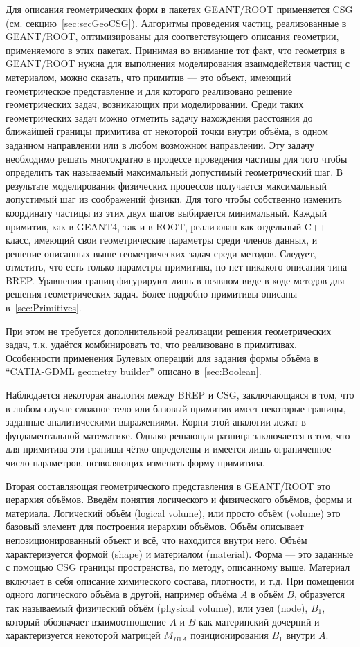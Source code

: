 Для описания геометрических форм в пакетах GEANT/ROOT применяется CSG (см. секцию~\ref{sec:secGeoCSG}).
Алгоритмы проведения частиц, реализованные в GEANT/ROOT, оптимизированы для соответствующего описания геометрии, применяемого в этих пакетах.
Принимая во внимание тот факт, что геометрия в GEANT/ROOT нужна для выполнения моделирования взаимодействия частиц с материалом, можно сказать, что примитив --- это объект, имеющий геометрическое представление и для которого реализовано решение геометрических задач, возникающих при моделировании. Среди таких геометрических задач можно отметить задачу нахождения расстояния до ближайшей границы примитива от некоторой точки внутри объёма, в одном заданном направлении или в любом возможном направлении. Эту задачу необходимо решать многократно в процессе проведения частицы для того чтобы определить так называемый максимальный допустимый геометрический шаг. В результате моделирования физических процессов получается максимальный допустимый шаг из соображений физики. Для того чтобы собственно изменить координату частицы из этих двух шагов выбирается минимальный. Каждый примитив, как в GEANT4, так и в ROOT, реализован как отдельный C++ класс, имеющий свои геометрические параметры среди членов данных, и решение описанных выше геометрических задач среди методов. Следует, отметить, что есть только параметры примитива, но нет никакого описания типа BREP. Уравнения границ фигурируют лишь в неявном виде в коде методов для решения геометрических задач. Более подробно примитивы описаны в~\ref{sec:Primitives}.

При этом не требуется дополнительной реализации решения геометрических задач, т.к. удаётся комбинировать то, что реализовано в примитивах.
Особенности применения Булевых операций для задания формы объёма в ``CATIA-GDML geometry builder'' описано в~\ref{sec:Boolean}.

Наблюдается некоторая аналогия между BREP и CSG, заключающаяся в том, что в любом случае сложное тело или базовый примитив имеет некоторые границы, заданные аналитическими выражениями. Корни этой аналогии лежат в фундаментальной математике. Однако решающая разница заключается в том, что для примитива эти границы чётко определены и имеется лишь ограниченное число параметров, позволяющих изменять форму примитива.

Вторая составляющая геометрического представления в GEANT/ROOT это иерархия объёмов.
Введём понятия логического и физического объёмов, формы и материала. Логический объём (logical volume), или просто объём (volume) это базовый элемент для построения иерархии объёмов. Объём описывает непозиционированный объект и всё, что находится внутри него. Объём характеризуется формой (shape) и материалом (material). Форма --- это заданные с помощью CSG границы пространства, по методу, описанному выше. Материал включает в себя описание химического состава, плотности, и т.д. При помещении одного логического объёма в другой, например объёма $A$ в объём $B$, образуется так называемый физический объём (physical volume), или узел (node), $B_1$, который обозначает взаимоотношение $A$ и $B$ как материнский-дочерний и характеризуется некоторой матрицей $M_{B1A}$ позиционирования $B_1$ внутри $A$.

